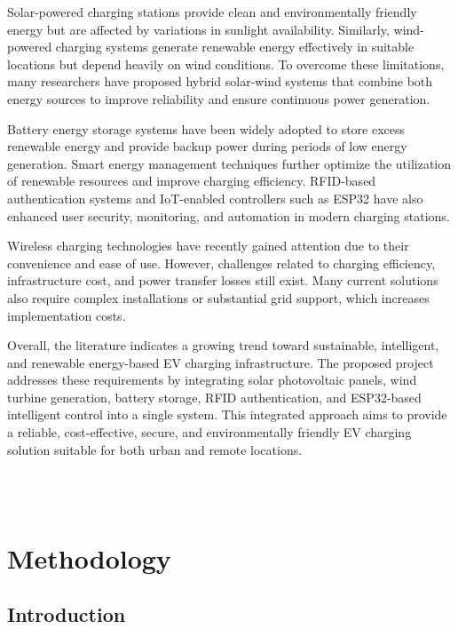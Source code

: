 \documentclass[12pt]{report}
\begin{document}
\begin{Certificatepage}
\begin{center}
\begin{justify}
\vspace{10pt}
Solar-powered charging stations provide clean and environmentally friendly energy but are affected by variations in sunlight availability. Similarly, wind-powered charging systems generate renewable energy effectively in suitable locations but depend heavily on wind conditions. To overcome these limitations, many researchers have proposed hybrid solar-wind systems that combine both energy sources to improve reliability and ensure continuous power generation.

\vspace{10pt}
Battery energy storage systems have been widely adopted to store excess renewable energy and provide backup power during periods of low energy generation. Smart energy management techniques further optimize the utilization of renewable resources and improve charging efficiency. RFID-based authentication systems and IoT-enabled controllers such as ESP32 have also enhanced user security, monitoring, and automation in modern charging stations.

\vspace{10pt}
Wireless charging technologies have recently gained attention due to their convenience and ease of use. However, challenges related to charging efficiency, infrastructure cost, and power transfer losses still exist. Many current solutions also require complex installations or substantial grid support, which increases implementation costs.

\vspace{10pt}
Overall, the literature indicates a growing trend toward sustainable, intelligent, and renewable energy-based EV charging infrastructure. The proposed project addresses these requirements by integrating solar photovoltaic panels, wind turbine generation, battery storage, RFID authentication, and ESP32-based intelligent control into a single system. This integrated approach aims to provide a reliable, cost-effective, secure, and environmentally friendly EV charging solution suitable for both urban and remote locations.

 
\\
\\
\chapter{Methodology}
\label{chapter3}

\section{Introduction}




\end{justify}
\end{center}
\end{Certificatepage}
\end{document}
